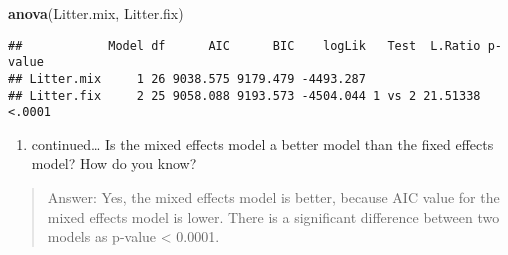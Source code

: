 \documentclass[]{article}
\newenvironment{Shaded}{\begin{snugshade}}{\end{snugshade}}
\newcommand{\KeywordTok}[1]{\textcolor[rgb]{0.13,0.29,0.53}{\textbf{#1}}}
\newcommand{\NormalTok}[1]{#1}
\providecommand{\tightlist}{%
  \setlength{\itemsep}{0pt}\setlength{\parskip}{0pt}}
\begin{document}
\begin{Shaded}
\begin{Highlighting}[]
\KeywordTok{anova}\NormalTok{(Litter.mix, Litter.fix)}
\end{Highlighting}
\end{Shaded}

\begin{verbatim}
##            Model df      AIC      BIC    logLik   Test  L.Ratio p-value
## Litter.mix     1 26 9038.575 9179.479 -4493.287                        
## Litter.fix     2 25 9058.088 9193.573 -4504.044 1 vs 2 21.51338  <.0001
\end{verbatim}

\begin{enumerate}
\def\labelenumi{\alph{enumi}.}
\setcounter{enumi}{3}
\tightlist
\item
  continued\ldots{} Is the mixed effects model a better model than the
  fixed effects model? How do you know?
\end{enumerate}

\begin{quote}
Answer: Yes, the mixed effects model is better, because AIC value for
the mixed effects model is lower. There is a significant difference
between two models as p-value \textless{} 0.0001.
\end{quote}
\end{document}
